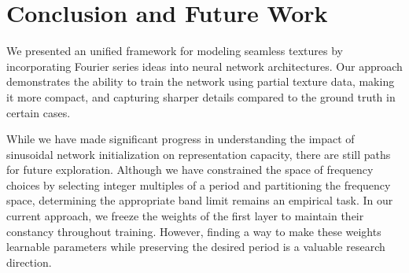 \section{Conclusion and Future Work}

We presented an unified framework for modeling seamless textures by incorporating Fourier series ideas into neural network architectures. 
Our approach demonstrates the ability to train the network using partial texture data, making it more compact, and capturing sharper details compared to the ground truth in certain cases.

While we have made significant progress in understanding the impact of sinusoidal network initialization on representation capacity, there are still paths for future exploration. Although we have constrained the space of frequency choices by selecting integer multiples of a period and partitioning the frequency space, determining the appropriate band limit remains an empirical task. In our current approach, we freeze the weights of the first layer to maintain their constancy throughout training. However, finding a way to make these weights learnable parameters while preserving the desired period is a valuable research direction.

